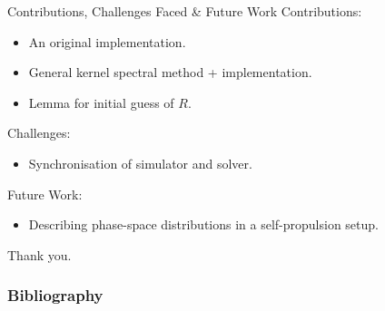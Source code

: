 \documentclass[aspectratio=169, hyperref={colorlinks=true}]{beamer}
\begin{document}
  \begin{frame}{Contributions, Challenges Faced \& Future Work}
    Contributions:
    \begin{itemize}
      \item An original implementation.
      \item General kernel spectral method + implementation.
      \item Lemma for initial guess of $R$.
    \end{itemize}

    Challenges:
    \begin{itemize}
      \item Synchronisation of simulator and solver.
    \end{itemize}

    Future Work:
    \begin{itemize}
      \item Describing phase-space distributions in a self-propulsion setup.
    \end{itemize}
  \end{frame}

  \begin{frame}{}
    Thank you.
  \end{frame}

  \begin{frame}[allowframebreaks]
    \frametitle{Bibliography}
    \printbibliography[heading=bibnumbered]
  \end{frame}
\end{document}
